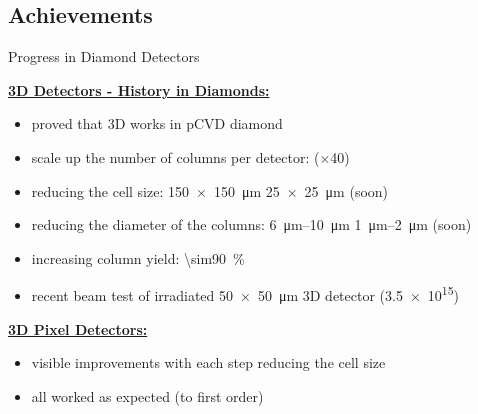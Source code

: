 \subsection{Achievements}
\begin{frame}{Progress in Diamond Detectors}

	\textbf{\underline{3D Detectors - History in Diamonds:}}\vspace*{5pt}
	\begin{itemize}\itemfill
		\item proved that 3D works in pCVD diamond
		\item scale up the number of columns per detector:  \ra {} ($\times$40)
		\item reducing the cell size: \SI{150x150}{\micro\meter} \ra {} \ra \SI{25x25}{\micro\meter} (soon)
		\item reducing the diameter of the columns: \SIrange{6}{10}{\micro\meter} \ra {} \ra \SIrange{1}{2}{\micro\meter} (soon)
		\item \ra increasing column yield: \SI{\sim90}{\%} \ra {}
		\item recent beam test of irradiated \SI{50x50}{\micro\meter} 3D detector (\SI{3.5e15}{\ncm})
	\end{itemize}
	
	\vspace*{5pt}\textbf{\underline{3D Pixel Detectors:}}\vspace*{5pt}
	\begin{itemize}\itemfill
		\item visible improvements with each step reducing the cell size
		\item all worked as expected (to first order)
	\end{itemize}

\end{frame}
